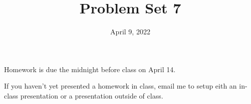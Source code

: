 \documentclass[12pt]{article}
\begin{document}
\newcommand{\skipp}{\textrm{skip}}
\newcommand{\boxprod}{\mathop{\square}}
\newcommand{\Set}{\textrm{Set}}
\newcommand{\Cat}{\textrm{Cat}}
\newcommand{\Ob}{\textrm{Ob}}
\newcommand{\Cayley}{\textrm{Cayley}}
\newcommand{\Preds}{\mathcal{P}}
\newcommand{\triple}[3]{\{#1\}{#2}\{#3\}}
\newcommand{\Triple}{\textrm{Triple}}
\newcommand{\Analyse}{\textrm{Analyse}}
\newcommand{\command}{\textrm{command}}

\newcommand{\id}{\textrm{id}}
\newcommand{\cat}{\mathbb}
\newcommand{\esh}{\text{\textesh}}


\newcommand{\isatype}{\,\,\textrm{type}}
\newcommand{\matchZero}{\textrm{match}_0}
\newcommand{\matchSum}[3]{\textrm{match}_+ {#1}\{{#2}\}\{{#3}\}}

\newcommand{\Yo}{\textrm{Y}}

\title{Problem Set 7}
\date{April 9, 2022}
\maketitle

Homework is due the midnight before class on April 14.

If you haven't yet presented a homework in class, email me to setup
eith an in-class presentation or a presentation outside of class.
\end{document}
